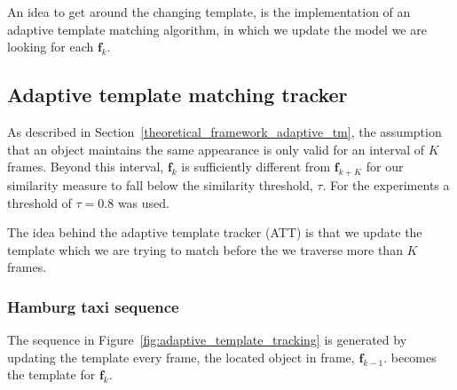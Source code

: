 An idea to get around the changing template, is the implementation of an
adaptive template matching algorithm, in which we update the model we are
looking for each $\mathbf{f}_k$.

\subsection{Adaptive template matching tracker}\label{results_adaptive_template_matching}
As described in Section~\ref{theoretical_framework_adaptive_tm}, the assumption
that an object maintains the same appearance is only valid for an interval of
$K$ frames. Beyond this interval, $\mathbf{f}_{k}$ is sufficiently different
from $\mathbf{f}_{k+K}$ for our similarity measure to fall below the similarity
threshold, $\tau$. For the experiments a threshold of $\tau=0.8$ was used.

The idea behind the adaptive template tracker (ATT) is that we update the
template which we are trying to match before the we traverse more than
$K$ frames.

\subsubsection{Hamburg taxi sequence}
The sequence in Figure~\ref{fig:adaptive_template_tracking} is generated by
updating the template every frame, the located object in frame,
$\mathbf{f}_{k-1}$. becomes the template for $\mathbf{f}_k$.

